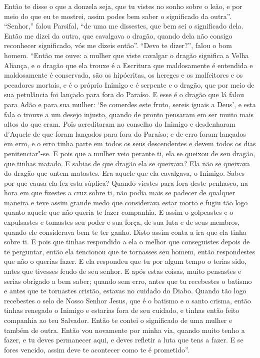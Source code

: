 Então te disse o que a donzela seja, que tu vistes no sonho sobre o leão, e
por meio do que eu te mostrei, assim podes bem saber o significado da outra”. 
“Senhor,” falou Parsifal, “de uma me dissestes, que bem sei
o significado dela. Então me dizei da outra, que cavalgava o dragão, quando
dela não consigo reconhecer significado, vós me dizeis então”. “Devo te
dizer?”, falou o bom homem. “Então me ouve: a mulher que viste cavalgar o
dragão significa a Velha Aliança, e o dragão que ela trouxe é a Escritura que
maldosamente é entendida e maldosamente é conservada, são os hipócritas, os
hereges e os malfeitores e os pecadores mortais, e é o próprio Inimigo e é
serpente e o dragão, que por meio de sua petulância foi lançado para fora do
Paraíso. E esse é o dragão que lá falou para Adão e para sua mulher: ‘Se
comerdes este fruto, sereis iguais a Deus’, e esta fala o trouxe a um desejo
injusto, quando de pronto pensaram em ser muito mais altos do que eram. Pois
acreditaram no conselho do Inimigo e desdenharam d’Aquele de que foram lançados
para fora do Paraíso; e de erro foram lançados em erro, e o erro tinha parte em
todos os seus descendentes e devem todos os dias penitenciar"-se. E pois que a
mulher veio perante ti, ela se queixou de seu dragão, que tinhas matado. E
sabias de que dragão ela se queixava? Ela não se queixava do dragão que ontem
matastes. Era aquele que ela cavalgava, o Inimigo. Sabes por que causa ela fez
esta súplica? Quando viestes para fora deste penhasco, na hora em que fizestes
a cruz sobre ti, não podia mais se padecer de qualquer maneira e teve assim
grande medo que considerava estar morto e fugiu tão logo quanto aquele que não
queria te fazer companhia. E assim o golpeastes e o expulsastes e tomastes seu
poder e sua força, de sua luta e de seus membros, quando ele considerava bem te
ter ganho. Disto assim conta a ira que ela tinha sobre ti. E pois que tinhas
respondido a ela o melhor que conseguistes depois de te perguntar, então ela
tencionou que te tornasses seu homem, então respondestes que não o querias
fazer. E ela respondeu que tu por algum tempo o terias sido, antes que tivesses
feudo de seu senhor. E após estas coisas, muito pensastes e serias obrigado a
bem saber; quando sem erro, antes que tu recebestes o batismo e antes que te
tornastes cristão, estavas no cuidado do Diabo. Quando tão logo recebestes o
selo de Nosso Senhor Jesus, que é o batismo e o santo crisma, então tinhas
renegado o Inimigo e estarias fora de seu cuidado, e tinhas então feito
companhia ao teu Salvador. Então te contei o significado de uma mulher e também
de outra. Então vou novamente por minha via, quando muito tenho a fazer, e tu
deves permanecer aqui, e deves refletir a luta que tens a fazer. E se fores
vencido, assim deve te acontecer como te é prometido”. 

